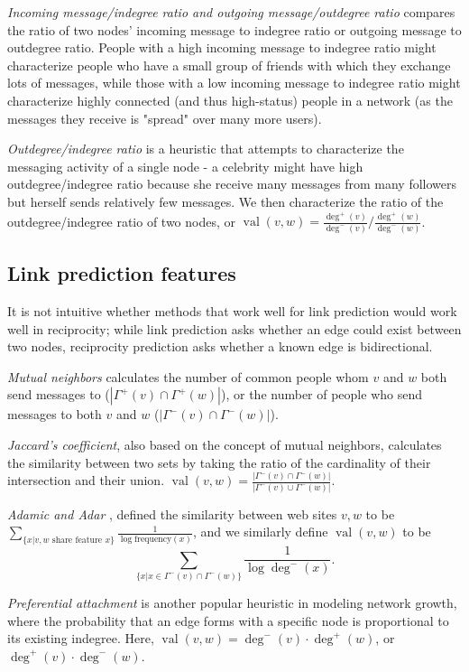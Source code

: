 \documentclass[conference]{IEEEtran}
\begin{document}
\emph{Incoming message/indegree ratio and outgoing message/outdegree ratio} compares the ratio of two nodes' incoming message to indegree ratio or outgoing message to outdegree ratio. People with a high incoming message to indegree ratio might characterize people who have a small group of friends with which they exchange lots of messages, while those with a low incoming message to indegree ratio might characterize highly connected (and thus high-status) people in a network (as the messages they receive is "spread" over many more users).

\emph{Outdegree/indegree ratio} is a heuristic that attempts to characterize the messaging activity of a single node - a celebrity might have high outdegree/indegree ratio because she receive many messages from many followers but herself sends relatively few messages. We then characterize the ratio of the outdegree/indegree ratio of two nodes, or $\operatorname{val}(v,w) = \frac{\deg^+(v)}{\deg^-(v)} / \frac{\deg^+(w)}{\deg^-(w)}$.

\subsection{Link prediction features}
It is not intuitive whether methods that work well for link prediction would work well in reciprocity; while link prediction asks whether an edge could exist between two nodes, reciprocity prediction asks whether a known edge is bidirectional.

\emph{Mutual neighbors} calculates the number of common people whom $v$ and $w$ both send messages to ($|\Gamma^+(v) \cap \Gamma^+(w)|$), or the number of people who send messages to both $v$ and $w$ ($|\Gamma^-(v) \cap \Gamma^-(w)|$).

\emph{Jaccard's coefficient}, also based on the concept of mutual neighbors, calculates the similarity between two sets by taking the ratio of the cardinality of their intersection and their union. $\operatorname{val}(v,w) = \frac{|\Gamma^-(v) \cap \Gamma^-(w)|}{|\Gamma^-(v) \cup \Gamma^-(w)|}$.

\emph{Adamic and Adar} \cite{Adamic:2003ud}, defined the similarity between web sites $v,w$ to be $ \sum_{\{x|v,w \text{ share feature }x\}} \frac{1}{\log{\text{frequency}(x)}} $, and we similarly define $\operatorname{val}(v,w)$ to be \[ \sum_{\{x|x \in \Gamma^-(v) \cap \Gamma^-(w)\}} \frac{1}{\log{\deg^-(x)}} .\]

\emph{Preferential attachment} is another popular heuristic in modeling network growth, where the probability that an edge forms with a specific node is proportional to its existing indegree. Here, $\operatorname{val}(v,w) = \deg^-(v)\cdot \deg^+(w)$, or $\deg^+(v)\cdot \deg^-(w)$.
\end{document}

